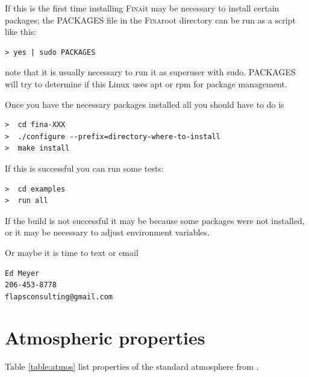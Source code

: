 \documentclass[10pt,openany,twoside]{book}
\numberwithin{equation}{section}   %
\newcommand{\Fina}{{\normalfont\scshape Fina\:}}
\newcommand{\Tableref}[1]{Table \ref{#1}}
\begin{document}
If this is the first time installing \Fina it may be necessary to
install certain packages; the PACKAGES file in the \Fina root directory
can be run as a script like this:
\begin{lstlisting}
> yes | sudo PACKAGES
\end{lstlisting}
note that it is usually necessary to run it as superuser with sudo.
PACKAGES will try to determine if this Linux uses apt or rpm for
package management.

Once you have the necessary packages installed all you should have
to do is
\begin{lstlisting}
>  cd fina-XXX
>  ./configure --prefix=directory-where-to-install
>  make install
\end{lstlisting}

If this is successful you can run some tests:
\begin{lstlisting}
>  cd examples
>  run all
\end{lstlisting}

If the build is not successful it may be because some packages
were not installed, or it may be necessary to adjust environment
variables.

Or maybe it is time to text or email
\begin{lstlisting}
Ed Meyer
206-453-8778
flapsconsulting@gmail.com
\end{lstlisting}

\newpage
\section{Atmospheric properties}\label{sect:atmos}
\Tableref{table:atmos} list properties of the standard atmosphere
from \cite{united1976us}.
\end{document}
